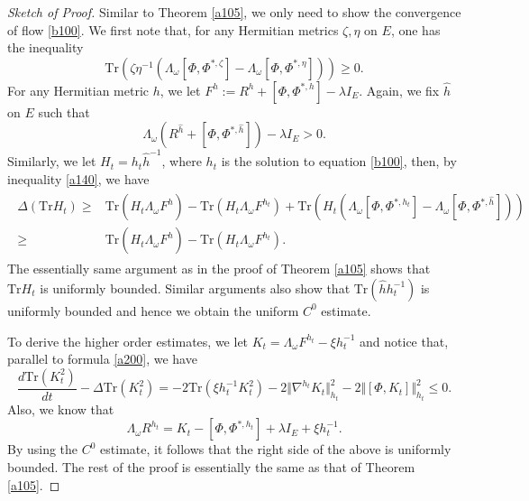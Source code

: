 \documentclass[11pt]{amsart}
\numberwithin{equation}{section}
\theoremstyle{remark}
\newcommand{\lb}{\left (}
\newcommand{\rb}{\right )}
\newcommand{\lsb}{\left [}
\newcommand{\rsb}{\right ]}
\newcommand{\tr}{\text{Tr}}
\begin{document}
\begin{proof}  [Sketch of Proof]

Similar to Theorem \ref{a105}, we only need to show the convergence of flow \eqref{b100}. We first note that, for any Hermitian metrics $\zeta, \eta$ on $E$, one has the inequality
\[
\tr \lb \zeta \eta^{-1}\lb \Lambda_\omega \lsb \Phi,\Phi^{*,\zeta}\rsb -\Lambda_\omega \lsb \Phi,\Phi^{*,\eta}\rsb\rb \rb\geq 0.
\]
For any Hermitian metric $h$, we let $F^h:=R^h+\lsb \Phi,\Phi^{*,h}\rsb-\lambda I_E$. Again, we fix $\hat h$ on $E$ such that \[\Lambda_\omega \lb R^{\hat h}+\lsb \Phi,\Phi^{*,\hat h}\rsb\rb-\lambda I_E>0.\]
Similarly, we let $H_t=h_t\hat h^{-1}$, where $h_t$ is the solution to equation \eqref{b100}, then, by inequality \eqref{a140},  we have
\begin{align*}
\begin{split}
\Delta \lb \tr H_t \rb \geq & \tr \lb H_t \Lambda_\omega F^{\hat h}\rb-\tr \lb H_t \Lambda_\omega F^{h_t}\rb +
\tr \lb H_t\lb \Lambda_\omega \lsb \Phi,\Phi^{*,h_t}\rsb -\Lambda_\omega \lsb \Phi,\Phi^{*,\hat h}\rsb\rb \rb\\
\geq & \tr \lb H_t \Lambda_\omega F^{\hat h}\rb-\tr \lb H_t \Lambda_\omega F^{h_t}\rb.
\end{split}
\end{align*}
The essentially same argument as in the proof of Theorem \ref{a105} shows that $\tr H_t$ is uniformly bounded. Similar arguments also show that $\tr \lb \hat h h_t^{-1}\rb$ is uniformly bounded and hence we obtain the uniform $C^0$ estimate.

To derive the higher order estimates,  we let $K_t=\Lambda_\omega F^{h_t}-\xi h_t^{-1}$ and notice that, parallel to formula \eqref{a200}, we have
\[
\frac{d \tr\lb K_t^2\rb}{dt}-\Delta \tr\lb K_t^2\rb=-2\tr \lb \xi h_t^{-1}K_t^2\rb-2 \Vert \nabla^{h_t}K_t \Vert_{h_t}^2-2 \Vert \lsb \Phi,K_t\rsb \Vert_{h_t}^2\leq 0.
\]
Also, we know that
\[
\Lambda_\omega R^{h_t}=K_t-\lsb\Phi,\Phi^{*,h_t}\rsb +\lambda I_E +\xi h_t^{-1}.
\]
By using the $C^0$ estimate, it follows that the right side of the above is uniformly bounded.
The rest of the proof is essentially the same as that of Theorem \ref{a105}.

\end{proof}


%
%
\end{document}

